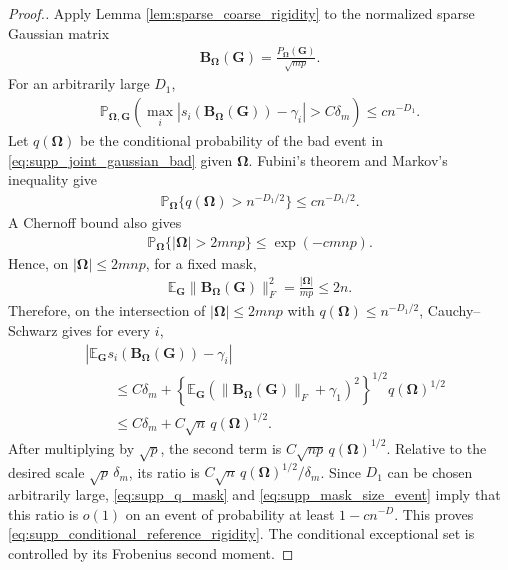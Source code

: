 \documentclass[numsec,webpdf,modern,large,namedate]{oup-authoring-template}
\theoremstyle{plain}
\theoremstyle{remark}
\newcommand{\bOmega}{\bm{\Omega}}
\newif\ifmarkchanges
\newenvironment{revision}{\begingroup\ifmarkchanges\color{red}\fi}{\endgroup}
\begin{document}
\begin{revision}
\begin{proof}[Proof.]
Apply Lemma \ref{lem:sparse_coarse_rigidity} to the normalized sparse
Gaussian matrix
\begin{align*}
    \bm B_{\bOmega}(\bm G)
    =\frac{P_{\bOmega}(\bm G)}{\sqrt{mp}}.
\end{align*}
For an arbitrarily large $D_1$,
\begin{align}
\label{eq:supp_joint_gaussian_bad}
    \mathbb P_{\bOmega,\bm G}\left(
    \max_i|s_i(\bm B_{\bOmega}(\bm G))-\gamma_i|
    >C\delta_m\right)
    \le cn^{-D_1}.
\end{align}
Let $q(\bOmega)$ be the conditional probability of the bad event in
\eqref{eq:supp_joint_gaussian_bad} given $\bOmega$.  Fubini's theorem and
Markov's inequality give
\begin{align}
\label{eq:supp_q_mask}
    \mathbb P_{\bOmega}\{q(\bOmega)>n^{-D_1/2}\}
    \le cn^{-D_1/2}.
\end{align}
A Chernoff bound also gives
\begin{align}
\label{eq:supp_mask_size_event}
    \mathbb P_{\bOmega}\{|\bOmega|>2mnp\}
    \le \exp(-cmnp).
\end{align}
Hence, on $|\bOmega|\le2mnp$, for a fixed mask,
\begin{align*}
    \mathbb E_{\bm G}\|\bm B_{\bOmega}(\bm G)\|_F^2
    =\frac{|\bOmega|}{mp}\le2n.
\end{align*}
Therefore, on the intersection of $|\bOmega|\le2mnp$ with
$q(\bOmega)\le n^{-D_1/2}$, Cauchy--Schwarz gives
for every $i$,
\begin{align*}
    &\left|
    \mathbb E_{\bm G}
      s_i(\bm B_{\bOmega}(\bm G))-\gamma_i
    \right|\\
    &\qquad\le C\delta_m
      +\left\{
      \mathbb E_{\bm G}
      (\|\bm B_{\bOmega}(\bm G)\|_F+\gamma_1)^2
      \right\}^{1/2}q(\bOmega)^{1/2}\\
    &\qquad\le C\delta_m
      +C\sqrt n\,q(\bOmega)^{1/2}.
\end{align*}
After multiplying by $\sqrt p$, the second term is
$C\sqrt{np}\,q(\bOmega)^{1/2}$.  Relative to the desired scale
$\sqrt p\,\delta_m$, its ratio is
$C\sqrt n\,q(\bOmega)^{1/2}/\delta_m$.  Since $D_1$ can be chosen
arbitrarily large, \eqref{eq:supp_q_mask} and
\eqref{eq:supp_mask_size_event} imply that this ratio is $o(1)$ on an event
of probability at least $1-cn^{-D}$.  This proves
\eqref{eq:supp_conditional_reference_rigidity}.  The conditional exceptional set is controlled by its Frobenius second moment.


\end{proof}
\end{revision}
\end{document}
